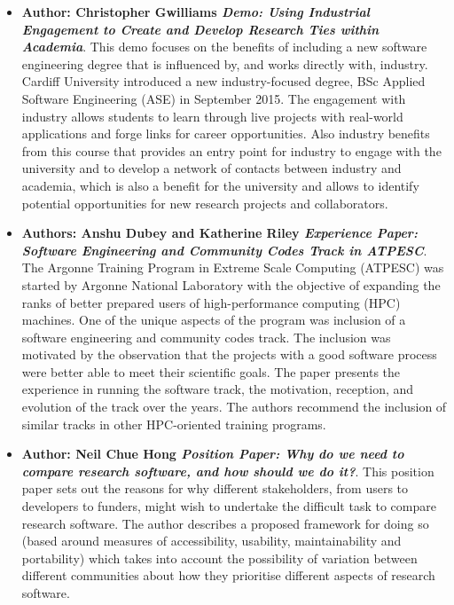 \documentclass[11pt, oneside]{amsart}
\begin{document}
\begin{itemize}
\item \textbf{Author: Christopher Gwilliams \emph{Demo: Using Industrial Engagement to Create and Develop Research Ties within Academia}}.
This demo focuses on the benefits of including a  new  software engineering degree that is influenced by, and works directly with,
industry.  Cardiff  University  introduced  a  new  industry-focused  degree, BSc Applied Software Engineering (ASE) in September
2015. The engagement with industry allows students to learn through live
projects  with  real-world  applications and forge links for career opportunities. Also industry benefits from this course that provides an entry point for industry to engage with the university and to develop a network of contacts between industry and academia, which is also a benefit for the university and allows to  identify  potential  opportunities for new research projects and collaborators.

\item \textbf{Authors: Anshu Dubey and Katherine Riley \emph{Experience Paper: Software Engineering and Community Codes Track in ATPESC}}.
The Argonne Training Program in Extreme Scale
Computing (ATPESC) was started by Argonne National Laboratory with the objective of expanding the ranks of better prepared users of high-performance computing (HPC) machines.
One of the unique aspects of the program was inclusion of a
software engineering and community codes track. The inclusion
was motivated by the observation that the projects with a good
software process were better able to meet their scientific goals.
The paper presents the experience in running the software
track, the motivation, reception, and evolution of the track over the years.  
The authors recommend the inclusion of similar tracks in other HPC-oriented training programs.

\item \textbf{Author: Neil Chue Hong \emph{Position Paper: Why do we need to compare research software, and how should we do it?}}.
This position paper sets out the reasons for why different  stakeholders, from users to developers 
to funders, might wish to undertake the difficult task to compare research software. The author describes a proposed framework for doing so (based around measures of accessibility, usability, maintainability and portability) which takes into account the possibility of variation between different communities about how they prioritise different aspects of research software.


\end{itemize}
\end{document}
